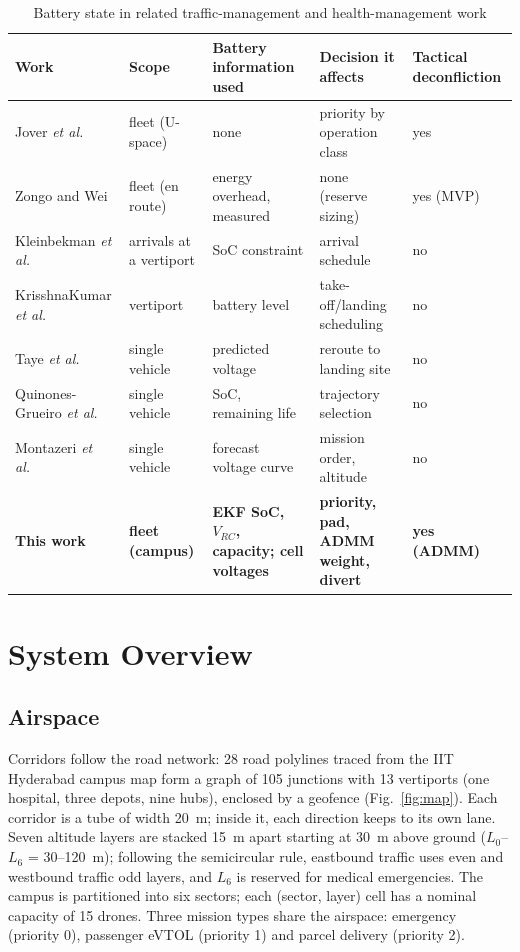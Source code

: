 \documentclass[journal]{IEEEtran}
\begin{document}
\begin{table}[t]
\centering
\caption{Battery state in related traffic-management and health-management work}
\label{tab:related}
\footnotesize
\begin{tabular}{@{}p{}p{}p{}p{}p{}@{}}
\toprule
Work & Scope & Battery information used & Decision it affects & Tactical deconfliction \\
\midrule
Jover \textit{et al.}~\cite{jover2022priority} & fleet (U-space) & none & priority by operation class & yes \\
Zongo and Wei~\cite{zongo2026overhead} & fleet (en route) & energy overhead, measured & none (reserve sizing) & yes (MVP) \\
Kleinbekman \textit{et al.}~\cite{kleinbekman2018evtol} & arrivals at a vertiport & SoC constraint & arrival schedule & no \\
KrisshnaKumar \textit{et al.}~\cite{krisshnakumar2023vertiport} & vertiport & battery level & take-off/landing scheduling & no \\
Taye \textit{et al.}~\cite{taye2025safe} & single vehicle & predicted voltage & reroute to landing site & no \\
Quinones-Grueiro \textit{et al.}~\cite{quinones2020decision} & single vehicle & SoC, remaining life & trajectory selection & no \\
Montazeri \textit{et al.}~\cite{montazeri2024health} & single vehicle & forecast voltage curve & mission order, altitude & no \\
\textbf{This work} & \textbf{fleet (campus)} & \textbf{EKF SoC, $V_{RC}$, capacity; cell voltages} & \textbf{priority, pad, ADMM weight, divert} & \textbf{yes (ADMM)} \\
\bottomrule
\end{tabular}
\end{table}

\section{System Overview}\label{sec:system}

\subsection{Airspace}
Corridors follow the road network: 28 road polylines traced from the IIT Hyderabad campus map form a graph of 105 junctions with 13 vertiports (one hospital, three depots, nine hubs), enclosed by a geofence (Fig.~\ref{fig:map}). Each corridor is a tube of width 20~m; inside it, each direction keeps to its own lane. Seven altitude layers are stacked 15~m apart starting at 30~m above ground ($L_0$--$L_6$ = 30--120~m); following the semicircular rule, eastbound traffic uses even and westbound traffic odd layers, and $L_6$ is reserved for medical emergencies. The campus is partitioned into six sectors; each (sector, layer) cell has a nominal capacity of 15 drones. Three mission types share the airspace: emergency (priority 0), passenger eVTOL (priority 1) and parcel delivery (priority 2).
\end{document}
